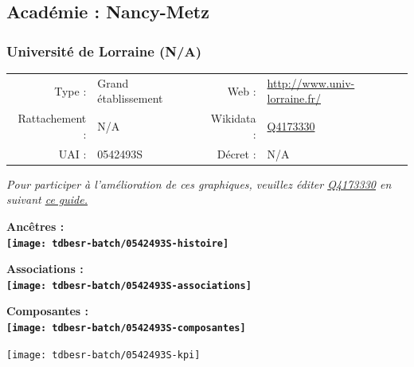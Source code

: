 \documentclass[12pt,french,]{article}
\begin{document}
\hypertarget{acaduxe9mie-nancy-metz}{%
\subsection{Académie : Nancy-Metz}\label{acaduxe9mie-nancy-metz}}

\hypertarget{universituxe9-de-lorraine-na}{%
\subsubsection{Université de Lorraine
(N/A)}\label{universituxe9-de-lorraine-na}}

\begin{tabular*}{\textwidth}{rp{5cm}rl}  
\hline  
Type : & Grand établissement & Web : &\href{http://www.univ-lorraine.fr/}{http://www.univ-lorraine.fr/} \\  
Rattachement : & N/A & Wikidata : & \href{https://www.wikidata.org/entity/Q4173330}{Q4173330} \\  
UAI : & 0542493S & Décret : & N/A \\  
\hline  
\end{tabular*}

\textit{\scriptsize Pour participer à l'amélioration de ces graphiques, veuillez éditer  \href{https://www.wikidata.org/entity/Q4173330}{Q4173330}  en suivant \href{https://github.com/cpesr/wikidataESR/blob/master/Rmd/wikidataESR.md}{ce guide.}}

\vspace{1cm}  
\begin{minipage}[b]{0.50\textwidth}\begin{center} \bf Ancêtres : \\  
\texttt{[image: tdbesr-batch/0542493S-histoire]} \end{center}\end{minipage}\begin{minipage}[b]{0.50\textwidth}\begin{center} \bf Associations : \\  
\texttt{[image: tdbesr-batch/0542493S-associations]} \end{center}\end{minipage}

\hrulefill

\begin{center} \bf Composantes : \\  
\texttt{[image: tdbesr-batch/0542493S-composantes]} \end{center}

\begin{center}\texttt{[image: tdbesr-batch/0542493S-kpi]} \end{center}\checkoddpage
\end{document}
